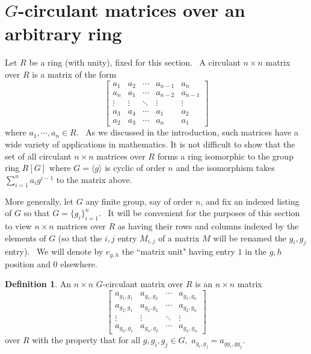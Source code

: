\documentclass[12pt, a4paper]{amsart}
\numberwithin{equation}{section} %
\theoremstyle{plain}
\theoremstyle{definition}
\newtheorem{defn}[thm]{Definition}
\theoremstyle{plain}
\theoremstyle{remark}
\begin{document}
\section{$G$-circulant matrices over an arbitrary ring}
Let $R$ be a ring (with unity), fixed for this section. \ A circulant $%
n\times n$ matrix over $R$ is a matrix of the form 
\[
\left[ 
\begin{array}{lllll}
a_{1} & a_{2} & \cdots  & a_{n-1} & a_{n} \\ 
a_{n} & a_{1} & \cdots  & a_{n-2} & a_{n-1} \\ 
\vdots  & \vdots  & \ddots  & \vdots  & \vdots  \\ 
a_{3} & a_{4} & \cdots  & a_{1} & a_{2} \\ 
a_{2} & a_{3} & \cdots  & a_{n} & a_{1}%
\end{array}%
\right] 
\]%
where $a_{1},\cdots ,a_{n}\in R$. \ As we discussed in the introduction, such matrices have a wide variety of
applications in mathematics.  It is not difficult to show that the
set of all circulant $n\times n$ matrices over $R$ forms a ring isomorphic
to the group ring $R[G]$ where $G= \langle g \rangle$ is cyclic of order $n$ and the
isomorphism takes $\sum\limits_{i=1}^{n}a_{i}g^{i-1}$ to the matrix above.

More generally, let $G$ any finite group, say of order $n$, and fix an
indexed listing of $G$ so that $G=\{g_{i}\}_{i=1}^{n}$. \ It will be
convenient for the purposes of this section to view $n\times n$ matrices
over $R$ as having their rows and columns indexed by the elements of $G$ (so
that the $i,j$ entry $M_{i,j}$ of a matrix $M$ will be renamed the $%
g_{i},g_{j}$ entry). \ We will denote by $e_{g,h}$ the ``matrix unit" having
entry $1$ in the $g,h$ position and $0$ elsewhere.

\begin{defn}
An $n \times n$ $G$-circulant matrix over $R$ is an $n\times n$ matrix 
\[
\left[ 
\begin{array}{llll}
a_{g_{1},g_{1}} & a_{g_{1},g_{2}} & \cdots  & a_{g_{1},g_{n}} \\ 
a_{g_{2},g_{1}} & a_{g_{2},g_{2}} & \cdots  & a_{g_{2},g_{n}} \\ 
\vdots  & \vdots  & \ddots  & \vdots  \\ 
a_{g_{n},g_{1}} & a_{g_{n},g_{2}} & \cdots  & a_{g_{n},g_{n}}%
\end{array}%
\right] 
\]%
over $R$ with the property that
for all $g,g_i,g_j \in G,$ $a_{g_i,g_j}=a_{gg_i,gg_j}$.\ 
\end{defn}
\end{document}
